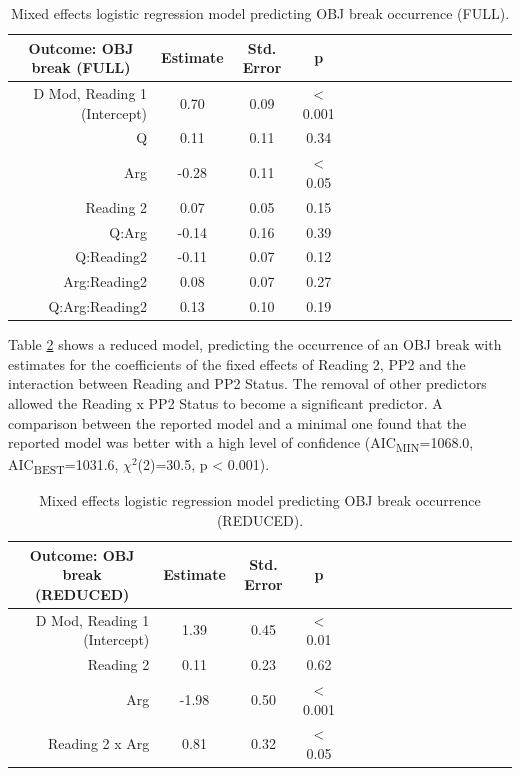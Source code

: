 \documentclass[12pt,oneside]{book}
\begin{document}
\begin{table}[!h]

\caption{\label{tab:fullobjmod}Mixed effects logistic regression model predicting OBJ break occurrence (FULL).}
\centering
\begin{tabular}{rcccrcccrcccrccc}
\toprule
\multicolumn{1}{c}{Outcome: OBJ break (FULL)} & \multicolumn{1}{c}{Estimate} & \multicolumn{1}{c}{Std. Error} & \multicolumn{1}{c}{p}\\
\midrule
D Mod, Reading 1 (Intercept) & 0.70 & 0.09 & < 0.001\\
Q & 0.11 & 0.11 & 0.34\\
Arg & -0.28 & 0.11 & < 0.05\\
Reading 2 & 0.07 & 0.05 & 0.15\\
Q:Arg & -0.14 & 0.16 & 0.39\\
\addlinespace
Q:Reading2 & -0.11 & 0.07 & 0.12\\
Arg:Reading2 & 0.08 & 0.07 & 0.27\\
Q:Arg:Reading2 & 0.13 & 0.10 & 0.19\\
\bottomrule
\end{tabular}
\end{table}

Table \ref{tab:objMod} shows a reduced model, predicting the occurrence of an OBJ break with estimates for the coefficients of the fixed effects of Reading 2, PP2 and the interaction between Reading and PP2 Status. The removal of other predictors allowed the Reading x PP2 Status to become a significant predictor. A comparison between the reported model and a minimal one found that the reported model was better with a high level of confidence (AIC\textsubscript{MIN}=1068.0, AIC\textsubscript{BEST}=1031.6, \(\chi^2\)(2)=30.5, p \textless{} 0.001).

\begin{table}[!h]

\caption{\label{tab:objMod}Mixed effects logistic regression model predicting OBJ break occurrence (REDUCED).}
\centering
\begin{tabular}{rcccrcccrcccrccc}
\toprule
\multicolumn{1}{c}{Outcome: OBJ break (REDUCED)} & \multicolumn{1}{c}{Estimate} & \multicolumn{1}{c}{Std. Error} & \multicolumn{1}{c}{p}\\
\midrule
D Mod, Reading 1 (Intercept) & 1.39 & 0.45 & < 0.01\\
Reading 2 & 0.11 & 0.23 & 0.62\\
Arg & -1.98 & 0.50 & < 0.001\\
Reading 2 x Arg & 0.81 & 0.32 & < 0.05\\
\bottomrule
\end{tabular}
\end{table}
\end{document}
